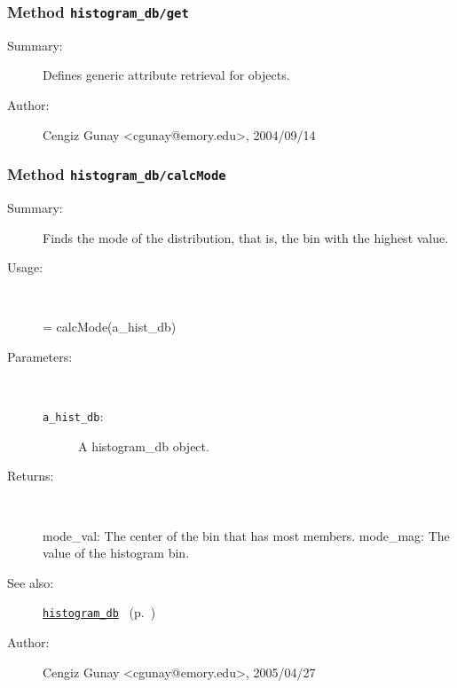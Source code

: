 \subsubsection[Method \texttt{get}]{Method \texttt{histogram\_db/get}}%
%
\label{ref_histogram_db__get}%
\hypertarget{ref_histogram_db__get}{}%
\begin{description}
\item[Summary:]Defines generic attribute retrieval for objects.
%
%
%
%
%
%
%
\item[Author:]%
Cengiz Gunay <cgunay@emory.edu>, 2004/09/14%
\end{description}
\methodline%
\subsubsection[Method \texttt{calcMode}]{Method \texttt{histogram\_db/calcMode}}%
%
\label{ref_histogram_db__calcMode}%
\hypertarget{ref_histogram_db__calcMode}{}%
\begin{description}
\item[Summary:]Finds the mode of the distribution, that is, the bin with the highest value.
%
\item[Usage:]~%
\begin{lyxcode}%
[mode\_val, mode\_mag] = calcMode(a\_hist\_db)
%
\end{lyxcode}%
%
%
\item[Parameters:]~
\begin{description}%
\item[\texttt{a\_hist\_db}:]
 A histogram\_db object.
\end{description}%
%
\item[Returns:]~

	mode\_val: The center of the bin that has most members.
	mode\_mag: The value of the histogram bin.
%
%
\item[See also:]%
\hyperlink{ref_histogram_db}{\texttt{histogram\_db}}%
\ (p.~\pageref{ref_histogram_db})%
%
%
\item[Author:]%
Cengiz Gunay <cgunay@emory.edu>, 2005/04/27%
\end{description}
\methodline%
